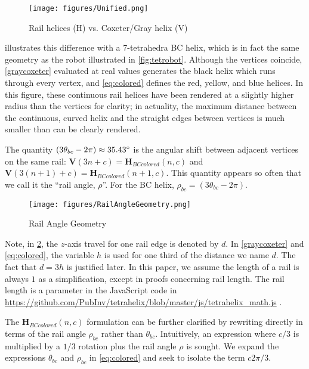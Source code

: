\documentclass[10pt,final]{journals-1.0/asme2ej}
\renewcommand{\vec}[1]{\mathbf{#1}}
\begin{document}
\begin{figure}
  \centering
     \texttt{[image: figures/Unified.png]}
     \caption{Rail helices (H) vs. Coxeter/Gray helix (V) }
  \label{fig:helixcomparison}  
\end{figure}

 illustrates this difference with a 7-tetrahedra BC helix, which is
in fact the same geometry as the robot illustrated in \cref{fig:tetrobot}.
Although the vertices coincide,
 \cref{graycoxeter} evaluated
at real values generates the black helix which runs through every vertex, and \cref{eq:colored} defines
the red, yellow, and blue helices. In this figure,
these continuous rail helices have been rendered at a slightly higher radius than the vertices for clarity;
in actuality, the maximum distance between the continuous, curved helix and the
straight edges between vertices is much smaller than can be clearly rendered.

The quantity $ (3 \theta_{bc} - 2 \pi) \approx 35.43 \degree $  is the angular shift between
adjacent vertices on the same rail:
$ \vec{V}(3n + c)= \vec{H}_{BCcolored}(n,c)$ and
$ \vec{V}(3(n+1)+c)= \vec{H}_{BCcolored}(n+1,c)$.
This quantity appears so often that we call it the ``rail angle, $\rho$''. For the BC helix, $\rho_{bc} = (3 \theta_{bc} - 2 \pi)$.

\begin{figure}
     \centering
     \texttt{[image: figures/RailAngleGeometry.png]}
     \caption{Rail Angle Geometry}
  \label{railanglefig}
\end{figure}

Note, in \cref{railanglefig}, the $z$-axis travel for one rail edge is denoted by $d$. In \cref{graycoxeter} and  \cref{eq:colored}, the variable
$h$ is used for one third of the distance we name $d$. The fact that $d = 3h$ is justified later.
In this paper, we assume the length of a rail
is always $1$ as a simplification, except in proofs concerning rail length.
The rail length is a parameter in the JavaScript code in
\url{https://github.com/PubInv/tetrahelix/blob/master/js/tetrahelix_math.js} \cite{readtetrahelix}.

The $\vec{H}_{BCcolored}(n,c)$ formulation can be further clarified by rewriting directly in terms of the rail angle $\rho_{bc}$ rather than $\theta_{bc}$.
Intuitively, an expression where $c/3$ is multiplied by a $1/3$ rotation plus the rail angle $\rho$ is sought.
We expand 
the expressions $\theta_{bc}$ and $\rho_{bc}$ in \cref{eq:colored} and seek to isolate the term $c 2\pi/3 $.
\end{document}
